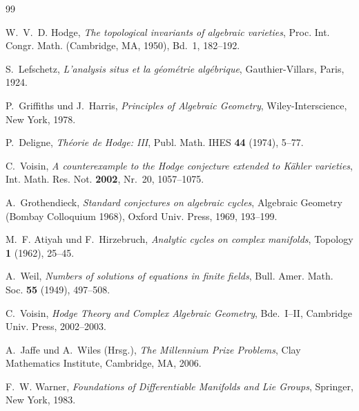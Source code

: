 \documentclass[12pt,a4paper]{amsart}
\theoremstyle{definition}
\theoremstyle{remark}
\begin{document}
\begin{thebibliography}{99}

W.~V.~D. Hodge,
\textit{The topological invariants of algebraic varieties},
Proc. Int. Congr. Math. (Cambridge, MA, 1950), Bd.~1, 182--192.

S.~Lefschetz,
\textit{L'analysis situs et la g\'eom\'etrie alg\'ebrique},
Gauthier-Villars, Paris, 1924.

P.~Griffiths und J.~Harris,
\textit{Principles of Algebraic Geometry},
Wiley-Interscience, New York, 1978.

P.~Deligne,
\textit{Th\'eorie de Hodge: III},
Publ. Math. IHES \textbf{44} (1974), 5--77.

C.~Voisin,
\textit{A counterexample to the Hodge conjecture extended to K\"ahler varieties},
Int. Math. Res. Not. \textbf{2002}, Nr.~20, 1057--1075.

A.~Grothendieck,
\textit{Standard conjectures on algebraic cycles},
Algebraic Geometry (Bombay Colloquium 1968), Oxford Univ. Press, 1969, 193--199.

M.~F. Atiyah und F.~Hirzebruch,
\textit{Analytic cycles on complex manifolds},
Topology \textbf{1} (1962), 25--45.

A.~Weil,
\textit{Numbers of solutions of equations in finite fields},
Bull. Amer. Math. Soc. \textbf{55} (1949), 497--508.

C.~Voisin,
\textit{Hodge Theory and Complex Algebraic Geometry}, Bde.~I--II,
Cambridge Univ. Press, 2002--2003.

A.~Jaffe und A.~Wiles (Hrsg.),
\textit{The Millennium Prize Problems},
Clay Mathematics Institute, Cambridge, MA, 2006.

F.~W. Warner,
\textit{Foundations of Differentiable Manifolds and Lie Groups},
Springer, New York, 1983.

\end{thebibliography}
\end{document}
